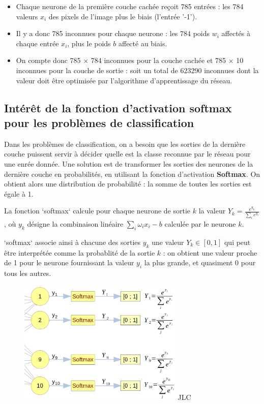 \documentclass{article}
\begin{document}
\begin{itemize}
\item Chaque neurone de la première couche cachée reçoit 785 entrées : les 784 valeurs $x_i$ des pixels de l'image plus le biais (l'entrée '-1'). 
\item Il y a donc 785 inconnues pour chaque neurone : les 784 poids $w_i$ affectés à chaque entrée $x_i$, plus le  poids $b$ affecté au biais.
\item On compte donc 785 $\times$ 784 inconnues pour la couche cachée et 785 $\times$ 10 inconnues pour la couche de sortie : 
soit un total de 623290 inconnues dont la valeur doit être optimisée par l'algorithme d'apprentissage du réseau.
\end{itemize}



\subsection{Intérêt de la fonction d'activation softmax pour les problèmes de classification}

Dans les problèmes de classification, on a besoin que les sorties de la dernière couche 
puissent servir à décider quelle est la classe reconnue par le réseau pour une enrée donnée.
Une solution est de transformer les sorties des neurones de la dernière couche en probabilités, 
en utilisant la fonction d'activation \textbf{Softmax}. On obtient alors une distribution de probabilité : 
la somme de toutes les sorties est égale à 1.


\bigskip



La fonction `softmax` calcule pour chaque neurone de sortie $k$ la valeur $\displaystyle{Y_k = \frac{e^{y_k}}{\sum_i{e^{y_i}}}}$,
où $y_k$ désigne la combinaison linéaire $\sum_i \omega_i x_i - b$ calculée par le neurone $k$.


\bigskip


`softmax` associe ainsi à chacune des sorties $y_k$ une valeur $Y_k \in [0, 1]$ 
qui peut être interprétée comme la probablité de la sortie $k$ : 
on obtient une valeur proche de 1 pour le neurone fournissant 
la valeur $y_i$ la plus grande, et quasiment 0 pour tous les autres.

\begin{figure}[H]
\centering
\includegraphics[width=0.7\textwidth]{img/softmax.png}
JLC
\end{figure}
\end{document}
